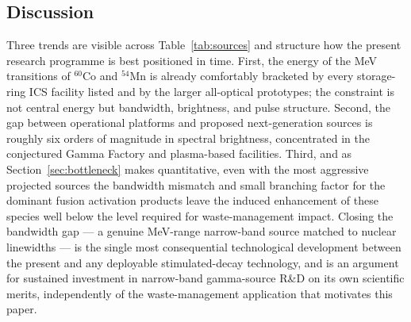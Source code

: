 \documentclass[conference]{IEEEtran}
\begin{document}
\subsection{Discussion}
Three trends are visible across Table~\ref{tab:sources} and structure how the present research programme is best positioned in time. First, the energy of the MeV transitions of $^{60}$Co and $^{54}$Mn is already comfortably bracketed by every storage-ring ICS facility listed and by the larger all-optical prototypes; the constraint is not central energy but bandwidth, brightness, and pulse structure. Second, the gap between operational platforms and proposed next-generation sources is roughly six orders of magnitude in spectral brightness, concentrated in the conjectured Gamma Factory and plasma-based facilities. Third, and as Section~\ref{sec:bottleneck} makes quantitative, even with the most aggressive projected sources the bandwidth mismatch and small branching factor for the dominant fusion activation products leave the induced enhancement of these species well below the level required for waste-management impact. Closing the bandwidth gap --- a genuine MeV-range narrow-band source matched to nuclear linewidths --- is the single most consequential technological development between the present and any deployable stimulated-decay technology, and is an argument for sustained investment in narrow-band gamma-source R\&D on its own scientific merits, independently of the waste-management application that motivates this paper.



\end{document}
